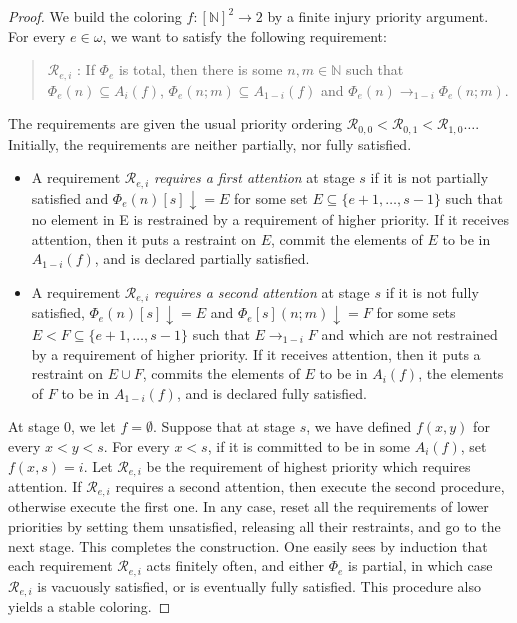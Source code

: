 \documentclass[10pt,a4paper]{amsart}
\def\N{\mathbb{N}}
\newcommand{\R}{\mathcal{R}}
\begin{document}
\begin{proof}
    We build the coloring $f : [\N]^2 \to 2$ by a finite injury priority argument. For
every $e \in \omega$, we want to satisfy the following requirement:
\begin{quote}
    $\R_{e,i}$ : If $\Phi_e$ is total, then there is some $n, m \in \N$ such that 
$\Phi_e(n) \subseteq A_i(f)$, $\Phi_e(n; m) \subseteq A_{1-i}(f)$ and $\Phi_e(n) \to_{1-i} \Phi_e(n; m)$.
\end{quote}

The requirements are given the usual priority ordering $\R_{0,0} < \R_{0,1} < \R_{1,0} \dots$. Initially, the
requirements are neither partially, nor fully satisfied.
\begin{itemize}
    \item A requirement $\R_{e,i}$ \emph{requires a first attention} at stage $s$ if it is not partially
satisfied and $\Phi_{e}(n)[s] \downarrow= E$ for some set $E \subseteq \{e + 1, \dots , s - 1\}$ such that
no element in E is restrained by a requirement of higher priority. If it
receives attention, then it puts a restraint on $E$, commit the elements of $E$
to be in $A_{1-i}(f)$, and is declared partially satisfied.
    \item  A requirement $\R_{e,i}$ \emph{requires a second attention} at stage $s$ if it is not fully
satisfied, $\Phi_{e}(n)[s] \downarrow= E$ and $\Phi_{e}[s](n; m) \downarrow= F$ for some sets $E < F \subseteq
\{e + 1, \dots , s - 1\}$ such that $E \to_{1-i} F$ and which are not restrained by
a requirement of higher priority. If it receives attention, then it puts a
restraint on $E \cup F$, commits the elements of $E$ to be in $A_{i}(f)$, the elements
of $F$ to be in $A_{1-i}(f)$, and is declared fully satisfied.
\end{itemize}
At stage $0$, we let $f = \emptyset$. Suppose that at stage $s$, we have defined $f(x, y)$ for every
$x < y < s$. For every $x < s$, if it is committed to be in some $A_i(f)$, set $f(x, s) = i$. Let $\R_{e,i}$ be the requirement of highest priority which
requires attention. If $\R_{e,i}$ requires a second attention, then execute the second
procedure, otherwise execute the first one. In any case, reset all the requirements
of lower priorities by setting them unsatisfied, releasing all their restraints, and go
to the next stage. This completes the construction. One easily sees by induction that each requirement $\R_{e,i}$ acts finitely often, and either $\Phi_e$ is partial, in which case $\R_{e,i}$ is vacuously satisfied, or is eventually fully satisfied. This
procedure also yields a stable coloring. 
\end{proof}
\end{document}
